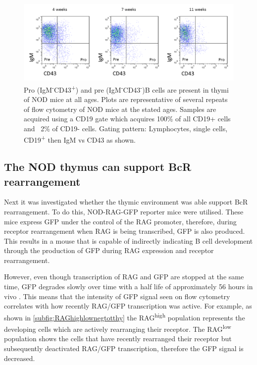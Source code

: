 \begin{figure}
	\includegraphics[width=\textwidth]{Figures/NODpropre.png}
	\caption{Pro (IgM\textsuperscript{-}CD43\textsuperscript{+}) and pre (IgM\textsuperscript{-}CD43\textsuperscript{-})B cells are present in thymi of NOD mice at all ages. Plots are representative of several repeats of flow cytometry of NOD mice at the stated ages. Samples are acquired using a CD19 gate which acquires 100\% of all CD19+ cells and ~2\% of CD19- cells. Gating pattern: Lymphocytes, single cells, CD19\textsuperscript{+} then IgM vs CD43 as shown.}
	\label{fig:propre}
\end{figure}

\subsection{The NOD thymus can support BcR rearrangement}

Next it was investigated whether the thymic environment was able support BcR rearrangement.
To do this, NOD-RAG-GFP reporter mice were utilised.
These mice express GFP under the control of the RAG promoter, therefore, during receptor rearrangement when RAG is being transcribed, GFP is also produced.
This results in a mouse that is capable of indirectly indicating B cell development through the production of GFP during RAG expression and receptor rearrangement.

However, even though transcription of RAG and GFP are stopped at the same time, GFP degrades slowly over time with a half life of approximately 56 hours in vivo \citep{McCaughtry2007}.
This means that the intensity of GFP signal seen on flow cytometry correlates with how recently RAG/GFP transcription was active.
For example, as shown in \cref{subfig:RAGhighlownegtotthy} the RAG\textsuperscript{high} population represents the developing cells which are actively rearranging their receptor.
The RAG\textsuperscript{low} population shows the cells that have recently rearranged their receptor but subsequently deactivated RAG/GFP transcription, therefore the GFP signal is decreased.

